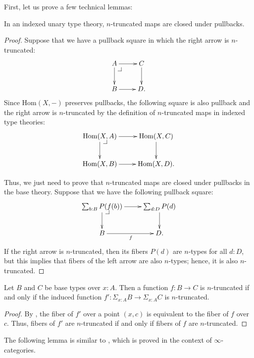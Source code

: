 \documentclass[reqno]{amsart}
\makeatletter
\theoremstyle{definition}
\theoremstyle{remark}
\newcommand{\fs}[1]{\mathrm{#1}}
\newcommand{\Hom}{\fs{Hom}}
\numberwithin{figure}{section}
\newcommand{\pb}[1][dr]{\save*!/#1-1.2pc/#1:(-1,1)@^{|-}\restore}
\makeatother
\begin{document}
First, let us prove a few technical lemmas:

\begin{lem}[trunc-pb]
In an indexed unary type theory, $n$-truncated maps are closed under pullbacks.
\end{lem}
\begin{proof}
Suppose that we have a pullback square in which the right arrow is $n$-truncated:
\[ \xymatrix{ A \ar[r] \ar[d] \pb   & C \ar[d] \\
              B \ar[r]              & D.
            } \]
Since $\Hom(X,-)$ preserves pullbacks, the following square is also pullback and the right arrow is $n$-truncated by the definition of $n$-truncated maps in indexed type theories:
\[ \xymatrix{ \Hom(X,A) \ar[r] \ar[d] \pb   & \Hom(X,C) \ar[d] \\
              \Hom(X,B) \ar[r]              & \Hom(X,D).
            } \]

Thus, we just need to prove that $n$-truncated maps are closed under pullbacks in the base theory.
Suppose that we have the following pullback square:
\[ \xymatrix{ \sum_{b : B} P(f(b)) \ar[r] \ar[d] \pb    & \sum_{d : D} P(d) \ar[d] \\
              B \ar[r]_f                                & D.
            } \]
If the right arrow is $n$-truncated, then its fibers $P(d)$ are $n$-types for all $d : D$, but this implies that fibers of the left arrow are also $n$-types; hence, it is also $n$-truncated.
\end{proof}

\begin{lem}
Let $B$ and $C$ be base types over $x : A$.
Then a function $f : B \to C$ is $n$-truncated if and only if the induced function $f' : \Sigma_{x : A} B \to \Sigma_{x : A} C$ is $n$-truncated.
\end{lem}
\begin{proof}
By \cite[Theorem~4.7.6]{hottbook}, the fiber of $f'$ over a point $(x,c)$ is equivalent to the fiber of $f$ over $c$.
Thus, fibers of $f'$ are $n$-truncated if and only if fibers of $f$ are $n$-truncated.
\end{proof}

The following lemma is similar to \cite[5.5.6.15]{lurie-topos}, which is proved in the context of $\infty$-categories.
\end{document}
